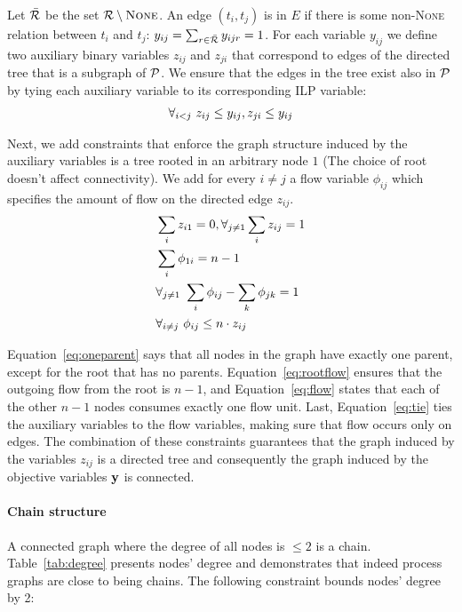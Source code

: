  Let $\bar{\mathcal{R}}$ be the set $\mathcal{R} \setminus \mbox{\textsc{None}}$. An edge $(t_i,t_j)$ is in $E$ if there is some non-\textsc{None} relation between $t_i$ and $t_j$: $y_{ij}=\sum_{r \in \bar{\mathcal{R}}} y_{ijr}=1$. For each variable $y_{ij}$ we define two auxiliary binary variables $z_{ij}$ and $z_{ji}$ that correspond to edges of the directed tree that is a subgraph of $\mathcal{P}$. We ensure that the edges in the tree exist also in $\mathcal{P}$ by tying each auxiliary variable to its corresponding ILP variable:
\begin{align}
\vspace{-3mm}
\forall_{i<j} \ z_{ij} \leq y_{ij}, z_{ji} \leq y_{ij}
\vspace{-3mm}
\end{align}

Next, we add constraints that enforce the graph structure induced by the auxiliary variables is a tree rooted in an arbitrary node $1$ (The choice of root doesn't affect connectivity). We add for every $i \neq j$ a flow variable $\phi_{ij}$ which specifies the amount of flow on the directed edge $z_{ij}$.
\begin{align}
\vspace{-3mm}
\small &\sum_{i} z_{i1} =0, \forall_{j \neq 1} \sum_{i} z_{ij}=1 \label{eq:oneparent} \\ 
&\sum_{i} \phi_{1i}=n-1 \label{eq:rootflow} \\ 
&\forall_{j \neq 1} \ \sum_{i} \phi_{ij} - \sum_{k} \phi_{jk}=1 \label{eq:flow} \\
&\forall_{i \neq j} \ \phi_{ij} \leq n \cdot z_{ij} \label{eq:tie} 
\end{align}

Equation~\ref{eq:oneparent} says that all nodes in the graph have exactly one parent, except for the root that has no parents. Equation~\ref{eq:rootflow} ensures that the outgoing flow from the root is $n-1$, and Equation~\ref{eq:flow} states that each of the other $n-1$ nodes consumes exactly one flow unit. Last, Equation~\ref{eq:tie} ties the auxiliary variables to the flow variables, making sure that flow occurs only on edges. The combination of these constraints guarantees that the graph induced by the variables $z_{ij}$ is a directed tree and consequently the graph induced by the objective variables $\mathbf{y}$ is connected.

\paragraph{Chain structure} 
A connected graph where the degree of all nodes is $\leq 2$ is a chain. Table~\ref{tab:degree} presents nodes' degree and demonstrates that indeed process graphs are close to being chains. The following constraint bounds nodes' degree by 2:

